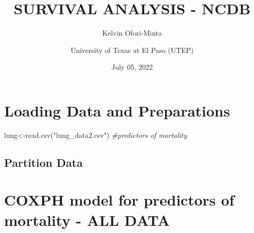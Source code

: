 \documentclass[
  11pt,
]{article}
\title{SURVIVAL ANALYSIS - NCDB}
\author{Kelvin Ofori-Minta \and University of Texas at El Paso (UTEP)}
\date{July 05, 2022}
\newenvironment{Shaded}{\begin{snugshade}}{\end{snugshade}}
\newcommand{\AttributeTok}[1]{\textcolor[rgb]{0.77,0.63,0.00}{#1}}
\newcommand{\CommentTok}[1]{\textcolor[rgb]{0.56,0.35,0.01}{\textit{#1}}}
\newcommand{\DecValTok}[1]{\textcolor[rgb]{0.00,0.00,0.81}{#1}}
\newcommand{\FloatTok}[1]{\textcolor[rgb]{0.00,0.00,0.81}{#1}}
\newcommand{\FunctionTok}[1]{\textcolor[rgb]{0.00,0.00,0.00}{#1}}
\newcommand{\NormalTok}[1]{#1}
\newcommand{\OtherTok}[1]{\textcolor[rgb]{0.56,0.35,0.01}{#1}}
\newcommand{\SpecialCharTok}[1]{\textcolor[rgb]{0.00,0.00,0.00}{#1}}
\newcommand{\StringTok}[1]{\textcolor[rgb]{0.31,0.60,0.02}{#1}}
\begin{document}
\maketitle

{
\setcounter{tocdepth}{4}
\tableofcontents
}
\newpage
\section{Loading Data and Preparations}

\begin{Shaded}
\begin{Highlighting}[]
\NormalTok{lung}\OtherTok{\textless{}{-}}\FunctionTok{read.csv}\NormalTok{(}\StringTok{"lung\_data2.csv"}\NormalTok{) }\CommentTok{\#predictors of mortality}
\end{Highlighting}
\end{Shaded}

\subsection{Partition Data}

\begin{Shaded}
\end{Shaded}

\newpage
\section{COXPH model for predictors of mortality - ALL DATA}
\end{document}
